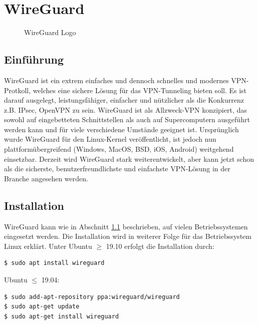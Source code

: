 
\chapter{WireGuard}
\begin{figure}[htbp]
  \centering
  
  \caption{WireGuard Logo}
\end{figure}

\section{Einführung} %
\label{einfuehrung}
WireGuard ist ein extrem einfaches und dennoch schnelles und modernes VPN-Protkoll, welches eine sichere Lösung für das VPN-Tunneling bieten soll. Es ist darauf ausgelegt, leistungsfähiger, einfacher und nützlicher als die Konkurrenz z.B. IPsec, OpenVPN  zu sein. WireGuard ist als Allzweck-VPN konzipiert, das sowohl auf eingebetteten Schnittstellen als auch auf Supercomputern ausgeführt werden kann und für viele verschiedene Umstände geeignet ist.  \newline\newline
Ursprünglich wurde WireGuard für den Linux-Kernel veröffentlicht, ist jedoch nun plattformübergreifend (Windows, MacOS, BSD, iOS, Android) weitgehend einsetzbar. Derzeit wird WireGuard stark weiterentwickelt, aber kann jetzt schon als die sicherste, benutzerfreundlichste und einfachste VPN-Lösung in der Branche angesehen werden.

\section{Installation} %
WireGuard kann wie in Abschnitt \ref{einfuehrung} beschrieben, auf vielen Betriebssystemen eingesetzt werden. Die Installation wird in weiterer Folge für das Betriebssystem Linux erklärt. \newline\newline
Unter Ubuntu $\geq$ 19.10 erfolgt die Installation durch:
\begin{lstlisting}
$ sudo apt install wireguard
\end{lstlisting}
Ubuntu $\leq$ 19.04:
\begin{lstlisting}
$ sudo add-apt-repository ppa:wireguard/wireguard
$ sudo apt-get update
$ sudo apt-get install wireguard
\end{lstlisting}

